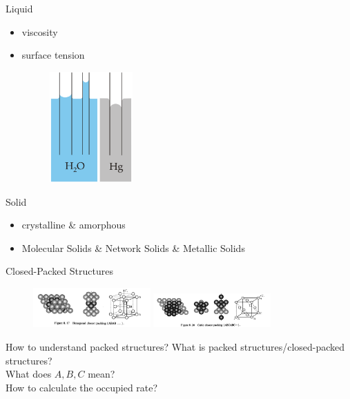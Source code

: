 \documentclass[12pt,compress]{beamer}
\begin{document}
\begin{frame}{Liquid}
	\begin{itemize}
		\item viscosity
		\item surface tension
		      \begin{figure}[!htbp]
			      \centering
			      \includegraphics[width=0.3\textwidth]{Capillarity.png}
		      \end{figure}
	\end{itemize}
\end{frame}

\begin{frame}{Solid}
	\begin{itemize}
		\item crystalline \& amorphous
		\item Molecular Solids \& Network Solids \& Metallic Solids
	\end{itemize}
\end{frame}

\begin{frame}{Closed-Packed Structures}
	\begin{figure}[!htbp]
		\begin{minipage}{14cm}
			\includegraphics[width=0.4\textwidth]{hcp.png}
			\includegraphics[width=0.4\textwidth]{ccp.png}
		\end{minipage}
	\end{figure}
	\begin{block}{How to understand packed structures?}
		What is packed structures/closed-packed structures? \\ 
		What does $A,B,C$ mean? \\ 
		How to calculate the occupied rate?
	\end{block}
\end{frame}
\end{document}
